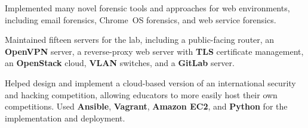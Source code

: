 


\begin{rExperience}

  \item Implemented many novel forensic tools and approaches for web environments, including email forensics, Chrome~OS
    forensics, and web service forensics.

%
%
%

  \item Maintained fifteen servers for the lab, including a public-facing router, an \textbf{OpenVPN} server, a
    reverse-proxy web server with \textbf{TLS} certificate management, an \textbf{OpenStack} cloud, \textbf{VLAN}
    switches, and a \textbf{GitLab} server.

  \item Helped design and implement a cloud-based version of an international security and hacking competition, allowing
    educators to more easily host their own competitions. Used \textbf{Ansible}, \textbf{Vagrant}, \textbf{Amazon EC2},
    and \textbf{Python} for the implementation and deployment.


\end{rExperience}
